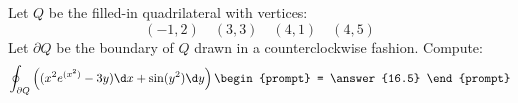 \documentclass{ximera}
\begin{document}
\begin{exercise}
  Let $Q$ be the filled-in quadrilateral with vertices:
  \[
  (-1,2)\quad (3,3)\quad (4,1)\quad (4,5) 
  \]
  Let $\partial Q$ be the boundary of $Q$ drawn in a counterclockwise
  fashion. Compute:
  \[
  \oint_{\partial Q} \left( (x^2 e^{(x^2)} -3y)\d x + \sin(y^2)\d y\right)
  \begin{prompt}
    = \answer{16.5}
  \end{prompt}
  \]
\end{exercise}
\end{document}
